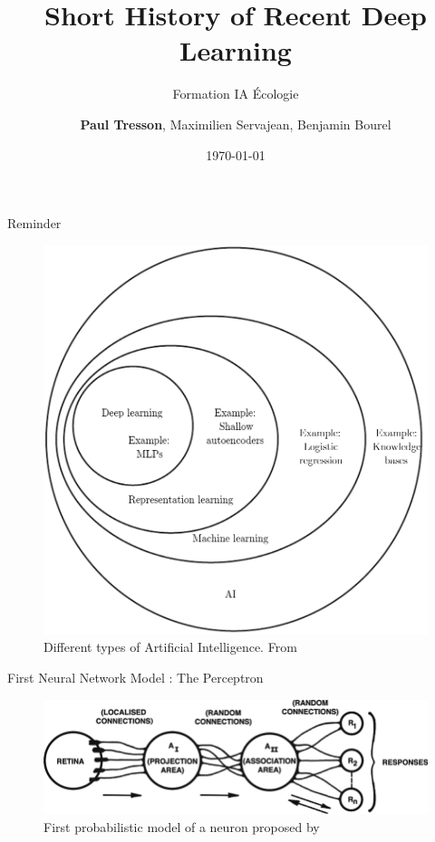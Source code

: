 \documentclass{irdbeamer}
\title{Short History of Recent Deep Learning}
\subtitle{Formation IA Écologie}
\author[Paul Tresson]{\textbf{Paul Tresson}, Maximilien Servajean, Benjamin Bourel}
\date{\today} %
\institute[Institut de Recherche pour le Développement]{UMR AMAP}
\begin{document}
\maketitle

\usebackgroundtemplate{}

\begin{frame}{Reminder}
    \begin{figure}
        \centering
        \vspace{-1cm}
        \includegraphics[width=0.45\linewidth]{figs/goodfellow_AI.png}
        \caption{\tiny Different types of Artificial Intelligence. From \cite{goodfellow2016deep}}
    \end{figure}
\end{frame}

\begin{frame}[t]{First Neural Network Model : The Perceptron}
    \begin{figure}
        \centering
        \includegraphics[width=\linewidth]{figs/perceptron.png}
        \caption{\tiny First probabilistic model of a neuron proposed by \cite{rosenblatt1958perceptron}}
    \end{figure}
\end{frame}
\end{document}

